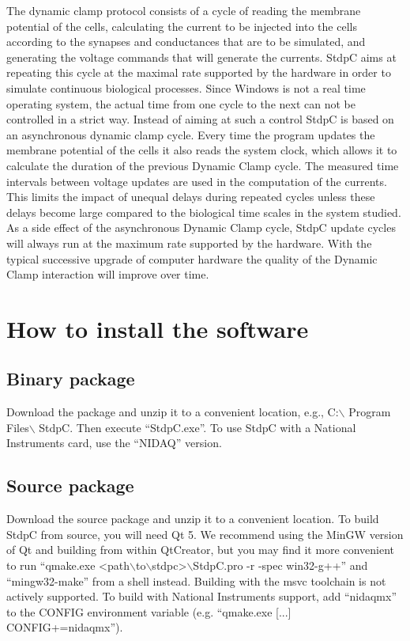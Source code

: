 \documentclass{article}
\begin{document}
The dynamic clamp protocol consists of a cycle of reading the membrane
potential of the cells, calculating the current to be injected into
the cells according to the synapses and conductances that are to be
simulated, and generating the voltage commands that will generate the
currents. StdpC aims at repeating this cycle at the maximal rate
supported by the hardware in order to simulate continuous biological
processes. Since Windows is not a real time operating system, the
actual time from one cycle to the next can not be controlled in a
strict way. Instead of aiming at such a control StdpC is based on an
asynchronous dynamic clamp cycle.  Every time the program updates the
membrane potential of the cells it also reads the system clock,
which allows it to calculate the duration of the previous
Dynamic Clamp cycle. The measured time intervals between voltage
updates are used in the computation of the currents. This limits the
impact of unequal delays during repeated cycles unless these delays
become large compared to the biological time scales in the system
studied. As a side effect of the asynchronous Dynamic Clamp cycle,
StdpC update cycles will always run at the maximum rate supported by
the hardware. With the typical successive upgrade of computer hardware
the quality of the Dynamic Clamp interaction will improve over time.


\section{How to install the software}

\subsection{Binary package}
Download the package and unzip it to a convenient location, e.g.,
C:$\backslash$ Program Files$\backslash$ StdpC. Then execute ``StdpC.exe''.
To use StdpC with a National Instruments card, use the ``NIDAQ'' version.

\subsection{Source package}
Download the source package and unzip it to a convenient
location. To build StdpC from source, you will need Qt 5. 
We recommend using the MinGW version of Qt and building from within QtCreator, 
but you may find it more convenient to run 
``qmake.exe <path$\backslash$to$\backslash$stdpc>$\backslash$StdpC.pro -r -spec win32-g++''
and ``mingw32-make'' from a shell instead. Building with the msvc toolchain is not actively supported.
To build with National Instruments support, add ``nidaqmx'' to the CONFIG environment variable 
(e.g. ``qmake.exe [...] CONFIG+=nidaqmx'').
\end{document}
